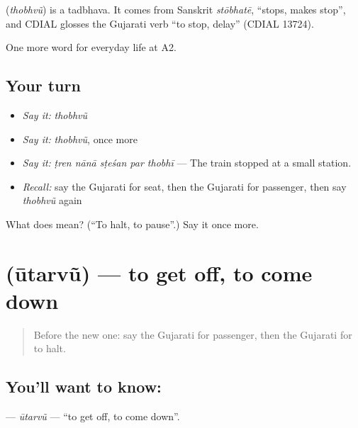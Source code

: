 \begin{cousinweb}
\textbf{} (\emph{thobhvũ}) is a tadbhava. It comes from Sanskrit \emph{stōbhatē}, \textquotedblleft{}stops, makes stop\textquotedblright{}, and CDIAL glosses the Gujarati verb \textquotedblleft{}to stop, delay\textquotedblright{} (CDIAL 13724).
\end{cousinweb}

\begin{grammarlens}[title={What you've built}]
One more word for everyday life at A2.
\end{grammarlens}

\subsection*{Your turn}
\begin{itemize}
\raggedright
  \item \emph{Say it:} \emph{thobhvũ}
  \item \emph{Say it:} \emph{thobhvũ}, once more
  \item \emph{Say it:} \emph{ṭren nānā sṭeśan par thobhī} — The train stopped at a small station.
  \item \emph{Recall:} say the Gujarati for seat, then the Gujarati for passenger, then say \emph{thobhvũ} again
\end{itemize}

\begin{tcolorbox}[breakable,colback=teal!4,colframe=teal!35!black,title={Before you move on}]
What does  mean? (\textquotedblleft{}To halt, to pause\textquotedblright{}.) Say it once more.
\end{tcolorbox}
\section[\texorpdfstring{\gu{ઊતરવું} (ūtarvũ)}{ઊતરવું (ūtarvũ)}]{ (ūtarvũ) — to get off, to come down}

\label{lesson:GU-C205-uutarvu}



\begin{quote}
Before the new one: say the Gujarati for passenger, then the Gujarati for to halt.
\end{quote}

\subsection*{You'll want to know: }
\textbf{} — \emph{ūtarvũ} — \textquotedblleft{}to get off, to come down\textquotedblright{}.

